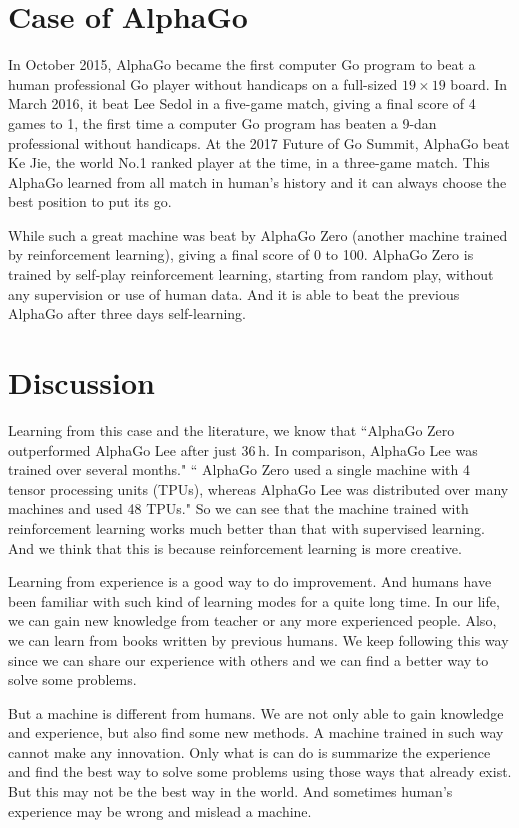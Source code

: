\documentclass[a4paper,12pt]{article}
\begin{document}
\section{Case of AlphaGo}
In October 2015, AlphaGo became the first computer Go program to beat a human professional Go player without handicaps on a full-sized $19\times19$ board.\cite{alphago} In March 2016, it beat Lee Sedol in a five-game match, giving a final score of 4 games to 1, the first time a computer Go program has beaten a 9-dan professional without handicaps.\cite{match1} At the 2017 Future of Go Summit, AlphaGo beat Ke Jie, the world No.1 ranked player at the time, in a three-game match. This AlphaGo learned from all match in human's history and it can always choose the best position to put its go.

While such a great machine was beat by AlphaGo Zero (another machine trained by reinforcement learning), giving a final score of 0 to 100. AlphaGo Zero is trained by self-play reinforcement learning, starting from random play, without any supervision or use of human data. And it is able to beat the previous AlphaGo after three days self-learning.

\section{Discussion}
Learning from this case and the literature\cite{case}, we know that ``AlphaGo Zero outperformed AlphaGo Lee after just 36 h. In comparison, AlphaGo Lee was trained over several months." `` AlphaGo Zero used a single machine with 4 tensor processing units (TPUs), whereas AlphaGo Lee was distributed over many machines and used 48 TPUs." So we can see that the machine trained with reinforcement learning works much better than that with supervised learning. And we think that this is because reinforcement learning is more creative. 

Learning from experience is a good way to do improvement. And humans have been familiar with such kind of learning modes for a quite long time. In our life, we can gain new knowledge from teacher or any more experienced people. Also, we can learn from books written by previous humans. We keep following this way since we can share our experience with others and we can find a better way to solve some problems. 

But a machine is different from humans. We are not only able to gain knowledge and experience, but also find some new methods. A machine trained in such way cannot make any innovation. Only what is can do is summarize the experience and find the best way to solve some problems using those ways that already exist. But this may not be the best way in the world. And sometimes human's experience may be wrong and mislead a machine.
\end{document}
